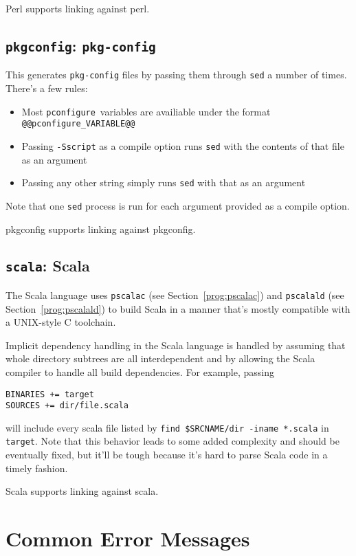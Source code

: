 \documentclass{article}
\newcommand{\pconfigure}{\texttt{pconfigure}}
\begin{document}
Perl supports linking against perl.

\subsection{\texttt{pkgconfig}: \texttt{pkg-config}}

This generates \texttt{pkg-config} files by passing them through
\texttt{sed} a number of times.  There's a few rules:

\begin{itemize}
\item Most \pconfigure\ variables are availiable under the format
  \texttt{@@pconfigure\_VARIABLE@@}
\item Passing \texttt{-Sscript} as a compile option runs \texttt{sed}
  with the contents of that file as an argument
\item Passing any other string simply runs \texttt{sed} with that as
  an argument
\end{itemize}

Note that one \texttt{sed} process is run for each argument provided
as a compile option.

pkgconfig supports linking against pkgconfig.

\subsection{\texttt{scala}: Scala}

The Scala language uses \texttt{pscalac} (see
Section~\ref{prog:pscalac}) and \texttt{pscalald} (see
Section~\ref{prog:pscalald}) to build Scala in a manner that's mostly
compatible with a UNIX-style C toolchain.

Implicit dependency handling in the Scala language is handled by
assuming that whole directory subtrees are all interdependent and by
allowing the Scala compiler to handle all build dependencies.  For example, passing
\begin{verbatim}
BINARIES += target
SOURCES += dir/file.scala
\end{verbatim}
will include every scala file listed by \texttt{find \$SRCNAME/dir
  -iname *.scala} in \texttt{target}.  Note that this behavior leads
to some added complexity and should be eventually fixed, but it'll be
tough because it's hard to parse Scala code in a timely fashion.

Scala supports linking against scala.

\section{Common Error Messages \label{err}}
\end{document}
